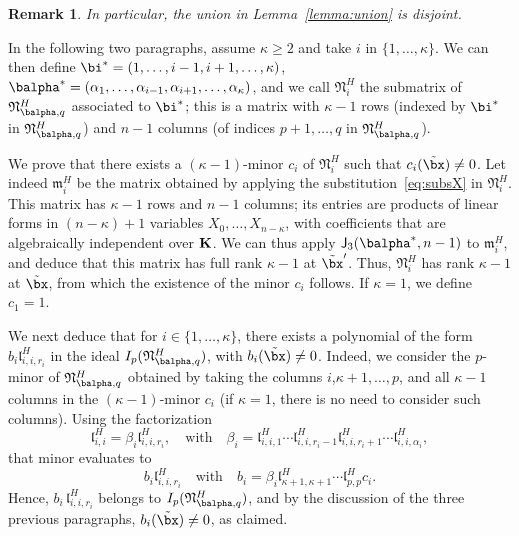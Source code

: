 \documentclass[12pt]{article}
\newtheorem{remark}[definition]{Remark}
\begin{document}
\begin{remark}\label{remark:disjoint}
  In particular, the union in Lemma~\ref{lemma:union} is disjoint.
\end{remark}

In the following two paragraphs, assume $\kappa \ge 2$
and take $i$ in $\{1,\dots,\kappa\}$. We can then define
$\bi^*=(1,\dots,i-1,i+1,\dots,\kappa)$,
$\balpha^*=(\alpha_1,\dots,\alpha_{i-1},\alpha_{i+1},\dots,\alpha_\kappa)$,
and we call $\mathfrak{N}^H_i$ the submatrix of
$\mathfrak{N}^H_{\balpha,q}$ associated to $\bi^*$; this is a matrix
with $\kappa-1$ rows (indexed by $\bi^*$ in
$\mathfrak{N}^H_{\balpha,q}$) and $n-1$ columns (of indices $p+1,\dots,q$ 
in $\mathfrak{N}^H_{\balpha,q}$).

We prove that there exists a $(\kappa-1)$-minor $c_i$ of
$\mathfrak{N}^H_i$ such that $c_i(\tilde\bx)\ne 0$.  Let indeed
$\mathfrak{m}^H_i$ be the matrix obtained by applying the
substitution~\eqref{eq:subsX} in $\mathfrak{N}^H_i$. This matrix 
has $\kappa-1$ rows and $n-1$ columns; its entries are products of
linear forms in $(n-\kappa)+1$ variables $X_0,\dots,X_{n-\kappa}$,
with coefficients that are algebraically
independent over $\mathbf{K}$. We can thus apply $\assI_3(\balpha^*,n-1)$ to
$\mathfrak{m}_{i}^H$, and deduce that this matrix has full rank $\kappa-1$
at $\tilde\bx'$.  Thus, $\mathfrak{N}^H_i$ has rank $\kappa-1$ at
$\tilde\bx$, from which the existence of the minor $c_i$ follows.
If $\kappa=1$, we define $c_1=1$.

We next deduce that for $i\in\{1,\dots,\kappa\}$, there exists a
polynomial of the form $b_{i} \mathfrak{l}^H_{i,i,r_i}$ in the ideal
$I_p(\mathfrak{N}^H_{\balpha,q})$, with $b_{i}(\tilde\bx)\ne
0$. Indeed, we consider the $p$-minor of $\mathfrak{N}^H_{\balpha,q}$
obtained by taking the columns $i$,$\kappa+1,\dots,p$, and all
$\kappa-1$ columns in the $(\kappa-1)$-minor $c_i$ (if $\kappa=1$,
there is no need to consider such columns). Using the factorization
$$\mathfrak{l}^H_{i,i} = \beta_i \mathfrak{l}^H_{i,i,r_i},\quad\text{with}\quad
\beta_i=\mathfrak{l}^H_{i,i,1}\cdots \mathfrak{l}^H_{i,i,r_i-1}\mathfrak{l}^H_{i,i,r_i+1}\cdots \mathfrak{l}^H_{i,i,\alpha_i},$$
that minor evaluates to 
$$b_i \mathfrak{l}^H_{i,i,r_i}\quad\text{with}\quad b_i = \beta_i
\mathfrak{l}^H_{\kappa+1,\kappa+1}\cdots \mathfrak{l}^H_{p,p}c_i.$$ Hence, $b_i\,
\mathfrak{l}^H_{i,i,r_i}$ belongs to $I_p(\mathfrak{N}^H_{\balpha,q})$, and by
the discussion of the three previous paragraphs, $b_i(\tilde\bx)\ne 0$,
as claimed.
\end{document}
